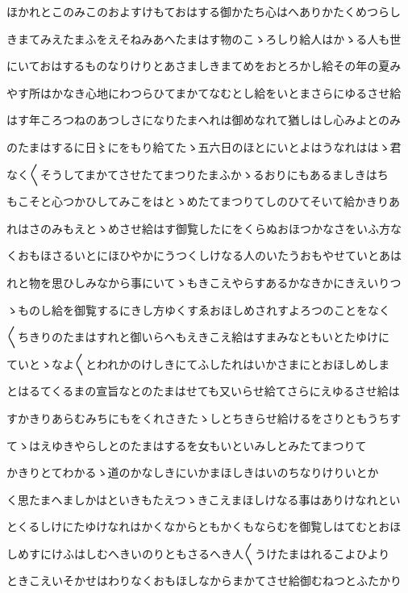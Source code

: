 \documentclass[a4paper,11pt,landscape]{ltjtarticle}
\begin{document}
ほかれとこのみこのおよすけもておはする御かたち心はへありかたくめつらし
\par\medskip
きまてみえたまふをえそねみあへたまはす物のこゝろしり給人はかゝる人も世
\par\medskip
にいておはするものなりけりとあさましきまてめをおとろかし給その年の夏み
\par\medskip
やす所はかなき心地にわつらひてまかてなむとし給をいとまさらにゆるさせ給
\par\medskip
はす年ころつねのあつしさになりたまへれは御めなれて猶しはし心みよとのみ
\par\medskip
のたまはするに日〻にをもり給てたゝ五六日のほとにいとよはうなれははゝ君
\par\medskip
なく〱そうしてまかてさせたてまつりたまふかゝるおりにもあるましきはち
\par\medskip
もこそと心つかひしてみこをはとゝめたてまつりてしのひてそいて給かきりあ
\par\medskip
れはさのみもえとゝめさせ給はす御覧したにをくらぬおほつかなさをいふ方な
\par\medskip
くおもほさるいとにほひやかにうつくしけなる人のいたうおもやせていとあは
\par\medskip
れと物を思ひしみなから事にいてゝもきこえやらすあるかなきかにきえいりつ
\par\medskip
ゝものし給を御覧するにきし方ゆくすゑおほしめされすよろつのことをなく
\par\medskip
〱ちきりのたまはすれと御いらへもえきこえ給はすまみなともいとたゆけに
\par\medskip
ていとゝなよ〱とわれかのけしきにてふしたれはいかさまにとおほしめしま
\par\medskip
とはるてくるまの宣旨なとのたまはせても又いらせ給てさらにえゆるさせ給は
\par\medskip
すかきりあらむみちにもをくれさきたゝしとちきらせ給けるをさりともうちす
\par\medskip
てゝはえゆきやらしとのたまはするを女もいといみしとみたてまつりて
\par\medskip
かきりとてわかるゝ道のかなしきにいかまほしきはいのちなりけりいとか
\par\medskip
く思たまへましかはといきもたえつゝきこえまほしけなる事はありけなれとい
\par\medskip
とくるしけにたゆけなれはかくなからともかくもならむを御覧しはてむとおほ
\par\medskip
しめすにけふはしむへきいのりともさるへき人〱うけたまはれるこよひより
\par\medskip
ときこえいそかせはわりなくおもほしなからまかてさせ給御むねつとふたかり
\end{document}
